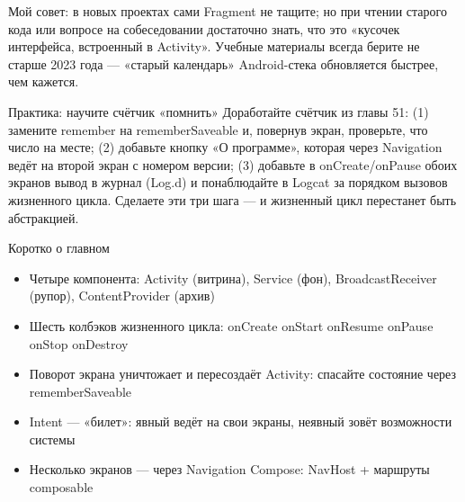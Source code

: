 Мой совет: в новых проектах сами Fragment не тащите; но при чтении старого кода или вопросе на собеседовании достаточно знать, что это «кусочек интерфейса, встроенный в Activity». Учебные материалы всегда берите не старше 2023 года — «старый календарь» Android-стека обновляется быстрее, чем кажется.

\begin{tcbpractice}{Практика: научите счётчик «помнить»}
Доработайте счётчик из главы 51: (1) замените remember на rememberSaveable и, повернув экран, проверьте, что число на месте; (2) добавьте кнопку «О программе», которая через Navigation ведёт на второй экран с номером версии; (3) добавьте в onCreate/onPause обоих экранов вывод в журнал (Log.d) и понаблюдайте в Logcat за порядком вызовов жизненного цикла. Сделаете эти три шага — и жизненный цикл перестанет быть абстракцией.

\end{tcbpractice}

\begin{tcbsummary}{Коротко о главном}
\begin{itemize}
  \item Четыре компонента: Activity (витрина), Service (фон), BroadcastReceiver (рупор), ContentProvider (архив)
  \item Шесть колбэков жизненного цикла: onCreate onStart onResume onPause onStop onDestroy
  \item Поворот экрана уничтожает и пересоздаёт Activity: спасайте состояние через rememberSaveable
  \item Intent — «билет»: явный ведёт на свои экраны, неявный зовёт возможности системы
  \item Несколько экранов — через Navigation Compose: NavHost + маршруты composable
\end{itemize}

\end{tcbsummary}

